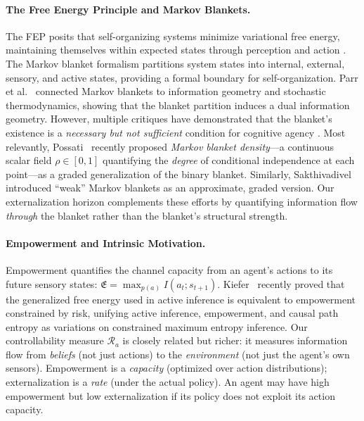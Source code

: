 \documentclass[runningheads]{llncs}
\begin{document}
\paragraph{The Free Energy Principle and Markov Blankets.}
The FEP posits that self-organizing systems minimize variational free energy, maintaining themselves within expected states through perception and action \cite{friston2006free,friston2010free}. The Markov blanket formalism \cite{pearl1988probabilistic,friston2013life,kirchhoff2018markov} partitions system states into internal, external, sensory, and active states, providing a formal boundary for self-organization. Parr et al.~\cite{parr2020information} connected Markov blankets to information geometry and stochastic thermodynamics, showing that the blanket partition induces a dual information geometry. However, multiple critiques have demonstrated that the blanket's existence is a \emph{necessary but not sufficient} condition for cognitive agency \cite{bruineberg2022emperor,raja2021free,biehl2021technical,aguilera2022particular}. Most relevantly, Possati~\cite{possati2025density} recently proposed \emph{Markov blanket density}---a continuous scalar field $\rho \in [0,1]$ quantifying the \emph{degree} of conditional independence at each point---as a graded generalization of the binary blanket. Similarly, Sakthivadivel~\cite{sakthivadivel2022weak} introduced ``weak'' Markov blankets as an approximate, graded version. Our externalization horizon complements these efforts by quantifying information flow \emph{through} the blanket rather than the blanket's structural strength.

\paragraph{Empowerment and Intrinsic Motivation.}
Empowerment \cite{klyubin2005empowerment,salge2014empowerment} quantifies the channel capacity from an agent's actions to its future sensory states: $\mathfrak{E} = \max_{p(a)} I(a_t; s_{t+1})$. Kiefer~\cite{kiefer2025empowerment} recently proved that the generalized free energy used in active inference is equivalent to empowerment constrained by risk, unifying active inference, empowerment, and causal path entropy as variations on constrained maximum entropy inference. Our controllability measure $\mathcal{R}_a$ is closely related but richer: it measures information flow from \emph{beliefs} (not just actions) to the \emph{environment} (not just the agent's own sensors). Empowerment is a \emph{capacity} (optimized over action distributions); externalization is a \emph{rate} (under the actual policy). An agent may have high empowerment but low externalization if its policy does not exploit its action capacity.
\end{document}

